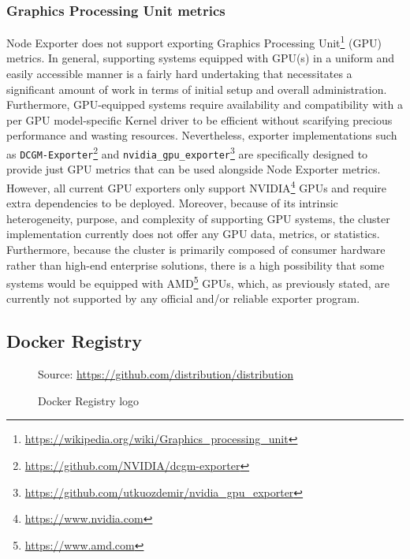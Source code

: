 \subsubsection{Graphics Processing Unit metrics}
\label{subsubsec:implementation_dependencies_node_exporter_graphics_processing_unit_metrics}

Node Exporter does not support exporting Graphics Processing Unit\footnote{\url{https://wikipedia.org/wiki/Graphics_processing_unit}}
(GPU) metrics. In general, supporting systems equipped with GPU(s) in a uniform and
easily accessible manner is a fairly hard undertaking that necessitates a significant
amount of work in terms of initial setup and overall administration. Furthermore,
GPU-equipped systems require availability and compatibility with a per GPU model-specific
Kernel driver to be efficient without scarifying precious performance and wasting
resources. Nevertheless, exporter implementations such as \texttt{DCGM-Exporter}\footnote{\url{https://github.com/NVIDIA/dcgm-exporter}}
and \texttt{nvidia\_gpu\_exporter}\footnote{\url{https://github.com/utkuozdemir/nvidia_gpu_exporter}}
are specifically designed to provide just GPU metrics that can be used alongside
Node Exporter metrics. However, all current GPU exporters only support NVIDIA\footnote{\url{https://www.nvidia.com}}
GPUs and require extra dependencies to be deployed. Moreover, because of its intrinsic
heterogeneity, purpose, and complexity of supporting GPU systems, the cluster
implementation currently does not offer any GPU data, metrics, or statistics. Furthermore,
because the cluster is primarily composed of consumer hardware rather than high-end
enterprise solutions, there is a high possibility that some systems would be equipped
with AMD\footnote{\url{https://www.amd.com}} GPUs, which, as previously stated,
are currently not supported by any official and/or reliable exporter program.

\subsection{Docker Registry}
\label{subsec:implementation_dependencies_docker_registry}

\begin{figure} %
  \centering
  \def\stackalignment{l} %
  {\scriptsize \parbox[t]{\linewidth}{ Source: \url{https://github.com/distribution/distribution}} }
  \caption{Docker Registry logo}
\end{figure}

